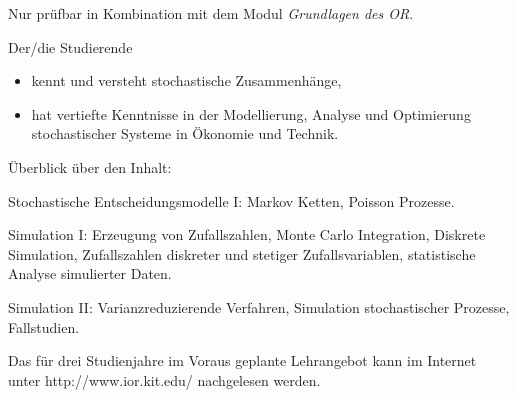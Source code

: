 \begin{module}
\begin{styleenv}
\begin{assessment}
\end{assessment}

\begin{conditions}Nur prüfbar in Kombination mit dem Modul \emph{Grundlagen des OR}.

 \end{conditions}


\end{styleenv}

\begin{learningoutcomes}
Der/die Studierende

 \begin{itemize}\item kennt und versteht stochastische Zusammenhänge,   \item hat vertiefte Kenntnisse in der Modellierung, Analyse und Optimierung stochastischer Systeme in Ökonomie und Technik.  \end{itemize}
\end{learningoutcomes}

\begin{content}
Überblick über den Inhalt:

 

Stochastische Entscheidungsmodelle I: Markov Ketten, Poisson Prozesse.

 

Simulation I: Erzeugung von Zufallszahlen, Monte Carlo Integration, Diskrete Simulation, Zufallszahlen diskreter und stetiger Zufallsvariablen, statistische Analyse simulierter Daten.

 

Simulation II: Varianzreduzierende Verfahren, Simulation stochastischer Prozesse, Fallstudien.


\end{content}

\begin{remarks}Das für drei Studienjahre im Voraus geplante Lehrangebot kann im Internet unter http://www.ior.kit.edu/ nachgelesen werden.

\end{remarks}

\end{module}


